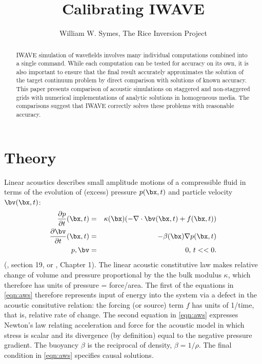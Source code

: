 \title{Calibrating IWAVE}
\date{}
\author{William W. Symes, The Rice Inversion Project}


\maketitle
\parskip 12pt
\begin{abstract}
IWAVE simulation of wavefields involves many individual computations combined into a single command. While each computation can be tested for accuracy on its own, it is also important to ensure that the final result accurately approximates the solution of the target continuum problem by direct comparison with solutions of known accuracy. This paper presents comparison of acoustic simulations on staggered and non-staggered grids with numerical implementations of analytic solutions in homogeneous media. The comparisons suggest that IWAVE correctly solves these problems with reasonable accuracy.
\end{abstract}

\section{Theory}
Linear acoustics describes small amplitude motions of a compressible fluid in terms of the evolution of (excess) pressure $p(\bx,t)$ and particle velocity $\bv(\bx,t)$: 
\begin{eqnarray}
\label{eqn:aws}
\frac{\partial p}{\partial t}(\bx,t) & = &\kappa(\bx) (-\nabla \cdot \bv(\bx,t) + f(\bx,t))\nonumber\\
\frac{\partial \bv}{\partial t}(\bx,t) & = & -\beta(\bx) \nabla p(\bx,t)\nonumber\\
p, \bv &=& 0,\, t << 0.
\end{eqnarray}
(\cite[]{gur81}, section 19, or \cite[]{Frie:58}, Chapter 1). The linear acoustic constitutive law makes relative change of volume and pressure proportional by the the bulk modulus $\kappa$, which therefore has units of pressure = force/area. The first of the equations in \ref{eqn:aws} therefore represents input of energy into the system via a defect in the acoustic consitutive relation: the forcing (or source) term $f$ has units of 1/time, that is, relative rate of change. The second equation in \ref{eqn:aws} expresses Newton's law relating acceleration and force for the acoustic model in which stress is scalar and its divergence (by definition) equal to the negative pressure gradient. The buoyancy $\beta$ is the reciprocal of density, $\beta=1/\rho$. The final condition in \ref{eqn:aws} specifies causal solutions.

